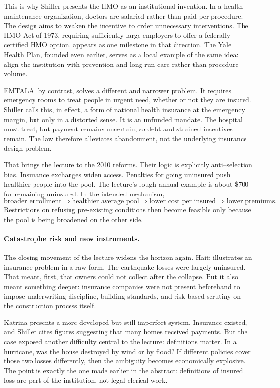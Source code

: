 This is why Shiller presents the HMO as an institutional invention. In a health maintenance organization, doctors are salaried rather than paid per procedure. The design aims to weaken the incentive to order unnecessary interventions. The HMO Act of 1973, requiring sufficiently large employers to offer a federally certified HMO option, appears as one milestone in that direction. The Yale Health Plan, founded even earlier, serves as a local example of the same idea: align the institution with prevention and long-run care rather than procedure volume.

EMTALA, by contrast, solves a different and narrower problem. It requires emergency rooms to treat people in urgent need, whether or not they are insured. Shiller calls this, in effect, a form of national health insurance at the emergency margin, but only in a distorted sense. It is an unfunded mandate. The hospital must treat, but payment remains uncertain, so debt and strained incentives remain. The law therefore alleviates abandonment, not the underlying insurance design problem.

That brings the lecture to the 2010 reforms. Their logic is explicitly anti--selection bias. Insurance exchanges widen access. Penalties for going uninsured push healthier people into the pool. The lecture's rough annual example is about \$700 for remaining uninsured. In the intended mechanism,
\begin{equation}
\text{broader enrollment} \Longrightarrow \text{healthier average pool} \Longrightarrow \text{lower cost per insured} \Longrightarrow \text{lower premiums}.
\end{equation}
Restrictions on refusing pre-existing conditions then become feasible only because the pool is being broadened on the other side.

\paragraph{Catastrophe risk and new instruments.} The closing movement of the lecture widens the horizon again. Haiti illustrates an insurance problem in a raw form. The earthquake losses were largely uninsured. That meant, first, that owners could not collect after the collapse. But it also meant something deeper: insurance companies were not present beforehand to impose underwriting discipline, building standards, and risk-based scrutiny on the construction process itself.

Katrina presents a more developed but still imperfect system. Insurance existed, and Shiller cites figures suggesting that many homes received payments. But the case exposed another difficulty central to the lecture: definitions matter. In a hurricane, was the house destroyed by wind or by flood? If different policies cover those two losses differently, then the ambiguity becomes economically explosive. The point is exactly the one made earlier in the abstract: definitions of insured loss are part of the institution, not legal clerical work.

